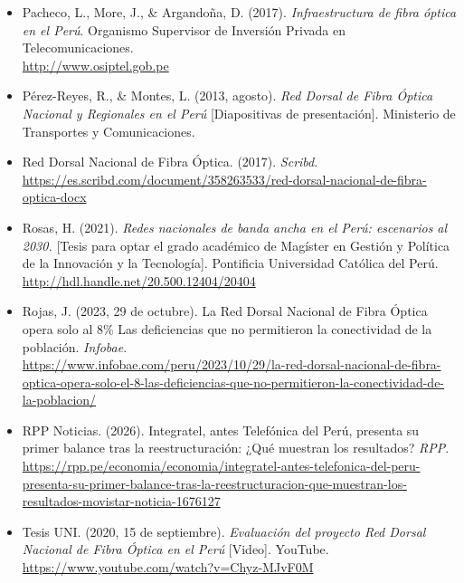 \begin{itemize}[leftmargin=1.27cm, itemindent=-1.27cm, label={}, itemsep=12pt, parsep=0pt]
\item Pacheco, L., More, J., \& Argandoña, D. (2017). \textit{Infraestructura de fibra óptica en el Perú}. Organismo Supervisor de Inversión Privada en Telecomunicaciones.\\
\url{http://www.osiptel.gob.pe}

\item Pérez-Reyes, R., \& Montes, L. (2013, agosto). \textit{Red Dorsal de Fibra Óptica Nacional y Regionales en el Perú} [Diapositivas de presentación]. Ministerio de Transportes y Comunicaciones.\\

\item Red Dorsal Nacional de Fibra Óptica. (2017). \textit{Scribd}.\\
\url{https://es.scribd.com/document/358263533/red-dorsal-nacional-de-fibra-optica-docx}

\item Rosas, H. (2021). \textit{Redes nacionales de banda ancha en el Perú: escenarios al 2030.} [Tesis para optar el grado académico de Magíster en Gestión y Política de la Innovación y la Tecnología]. Pontificia Universidad Católica del Perú.\\
\url{http://hdl.handle.net/20.500.12404/20404}

\item Rojas, J. (2023, 29 de octubre). La Red Dorsal Nacional de Fibra Óptica opera solo al 8\% Las deficiencias que no permitieron la conectividad de la población. \textit{Infobae}.\\
\url{https://www.infobae.com/peru/2023/10/29/la-red-dorsal-nacional-de-fibra-optica-opera-solo-el-8-las-deficiencias-que-no-permitieron-la-conectividad-de-la-poblacion/}

\item RPP Noticias. (2026). Integratel, antes Telefónica del Perú, presenta su primer balance tras la reestructuración: ¿Qué muestran los resultados? \textit{RPP}.\\
\url{https://rpp.pe/economia/economia/integratel-antes-telefonica-del-peru-presenta-su-primer-balance-tras-la-reestructuracion-que-muestran-los-resultados-movistar-noticia-1676127}

\item Tesis UNI. (2020, 15 de septiembre). \textit{Evaluación del proyecto Red Dorsal Nacional de Fibra Óptica en el Perú} [Video]. YouTube.\\
\url{https://www.youtube.com/watch?v=Chyz-MJvF0M}


\end{itemize}
